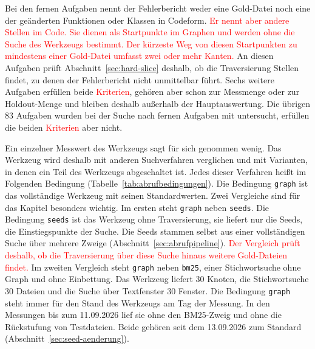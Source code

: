 Bei den fernen Aufgaben nennt der Fehlerbericht weder eine Gold-Datei noch eine der geänderten Funktionen oder Klassen in Codeform. \textcolor{red}{Er nennt aber andere Stellen im Code. Sie dienen als Startpunkte im Graphen und werden ohne die Suche des Werkzeugs bestimmt. Der kürzeste Weg von diesen Startpunkten zu mindestens einer Gold-Datei umfasst zwei oder mehr Kanten.} An diesen Aufgaben prüft Abschnitt~\ref{sec:hard-slice} deshalb, ob die Traversierung Stellen findet, zu denen der Fehlerbericht nicht unmittelbar führt. Sechs weitere Aufgaben erfüllen beide \textcolor{red}{Kriterien}, gehören aber schon zur Messmenge oder zur Holdout-Menge und bleiben deshalb außerhalb der Hauptauswertung. Die übrigen 83 Aufgaben wurden bei der Suche nach fernen Aufgaben mit untersucht, erfüllen die beiden \textcolor{red}{Kriterien} aber nicht.

Ein einzelner Messwert des Werkzeugs sagt für sich genommen wenig. Das Werkzeug wird deshalb mit anderen Suchverfahren verglichen und mit Varianten, in denen ein Teil des Werkzeugs abgeschaltet ist. Jedes dieser Verfahren heißt im Folgenden Bedingung (Tabelle~\ref{tab:abrufbedingungen}). Die Bedingung \texttt{graph} ist das vollständige Werkzeug mit seinen Standardwerten. Zwei Vergleiche sind für das Kapitel besonders wichtig. Im ersten steht \texttt{graph} neben \texttt{seeds}. Die Bedingung \texttt{seeds} ist das Werkzeug ohne Traversierung, sie liefert nur die Seeds, die Einstiegspunkte der Suche. Die Seeds stammen selbst aus einer vollständigen Suche über mehrere Zweige (Abschnitt~\ref{sec:abrufpipeline}). \textcolor{red}{Der Vergleich prüft deshalb, ob die Traversierung über diese Suche hinaus weitere Gold-Dateien findet.} Im zweiten Vergleich steht \texttt{graph} neben \texttt{bm25}, einer Stichwortsuche ohne Graph und ohne Einbettung. Das Werkzeug liefert 30 Knoten, die Stichwortsuche 30 Dateien und die Suche über Textfenster 30 Fenster. Die Bedingung \texttt{graph} steht immer für den Stand des Werkzeugs am Tag der Messung. In den Messungen bis zum 11.09.2026 lief sie ohne den BM25-Zweig und ohne die Rückstufung von Testdateien. Beide gehören seit dem 13.09.2026 zum Standard (Abschnitt~\ref{sec:seed-aenderung}).

